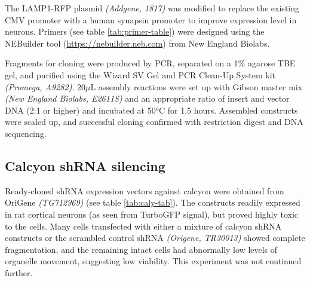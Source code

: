 \documentclass[
  12pt,
  a4paper,
]{book}
\begin{document}
The LAMP1-RFP plasmid \emph{(Addgene, 1817)} was modified to replace the existing CMV promoter with a human synapsin promoter to improve expression level in neurons. Primers (see table \ref{tab:primer-table}) were designed using the NEBuilder tool (\url{https://nebuilder.neb.com}) from New England Biolabs.

\begin{table}

\caption{\label{tab:primer-table}Gibson cloning primers.}
\centering
{}
\end{table}

Fragments for cloning were produced by PCR, separated on a 1\% agarose TBE gel, and purified using the Wizard SV Gel and PCR Clean-Up System kit \emph{(Promega, A9282)}. 20\(\mu\)L assembly reactions were set up with Gibson master mix \emph{(New England Biolabs, E2611S)} and an appropriate ratio of insert and vector DNA (2:1 or higher) and incubated at 50°C for 1.5 hours. Assembled constructs were scaled up, and successful cloning confirmed with restriction digest and DNA sequencing.

\hypertarget{calcyon-shrna-silencing}{%
\subsection{Calcyon shRNA silencing}\label{calcyon-shrna-silencing}}

Ready-cloned shRNA expression vectors against calcyon were obtained from OriGene \emph{(TG712969)} (see table \ref{tab:caly-tab}). The constructs readily expressed in rat cortical neurons (as seen from TurboGFP signal), but proved highly toxic to the cells. Many cells transfected with either a mixture of calcyon shRNA constructs or the scrambled control shRNA \emph{(Origene, TR30013)} showed complete fragmentation, and the remaining intact cells had abnormally low levels of organelle movement, suggesting low viability. This experiment was not continued further.
\end{document}
